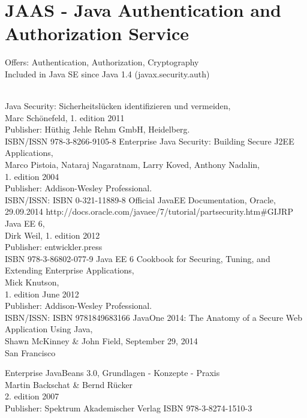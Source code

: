 \documentclass[12pt,a4paper]{report}
\begin{document}
\section{JAAS - Java Authentication and Authorization Service}
Offers: Authentication, Authorization, Cryptography\\
Included in Java SE since Java 1.4 (javax.security.auth)\\\\

\newpage
\begin{thebibliography}{99}
Java Security: Sicherheitslücken identifizieren und vermeiden, \\
Marc Schönefeld, 1. edition 2011\\
Publisher: Hüthig Jehle Rehm GmbH, Heidelberg. \\
ISBN/ISSN 978-3-8266-9105-8
Enterprise Java Security: Building Secure J2EE Applications,\\
Marco Pistoia, Nataraj Nagaratnam, Larry Koved, Anthony Nadalin,\\
1. edition 2004 \\
Publisher: Addison-Wesley Professional.\\
ISBN/ISSN: ISBN 0-321-11889-8
Official JavaEE Documentation, Oracle,\\
29.09.2014
http://docs.oracle.com/javaee/7/tutorial/partsecurity.htm\#GIJRP
Java EE 6,\\
Dirk Weil, 1. edition 2012\\
Publisher: entwickler.press\\
ISBN 978-3-86802-077-9
Java EE 6 Cookbook for Securing, Tuning, and Extending Enterprise Applications,\\
Mick Knutson,\\
1. edition June 2012 \\
Publisher: Addison-Wesley Professional.\\
ISBN/ISSN: ISBN 9781849683166
JavaOne 2014: The Anatomy of a Secure Web Application Using Java, \\
Shawn McKinney \& John Field, September 29, 2014\\
San Francisco

Enterprise JavaBeans 3.0, Grundlagen - Konzepte - Praxis\\
Martin Backschat \& Bernd Rücker\\
2. edition 2007\\
Publisher: Spektrum Akademischer Verlag
ISBN 978-3-8274-1510-3

\newpage
\listoffigures
\end{thebibliography}
\end{document}
